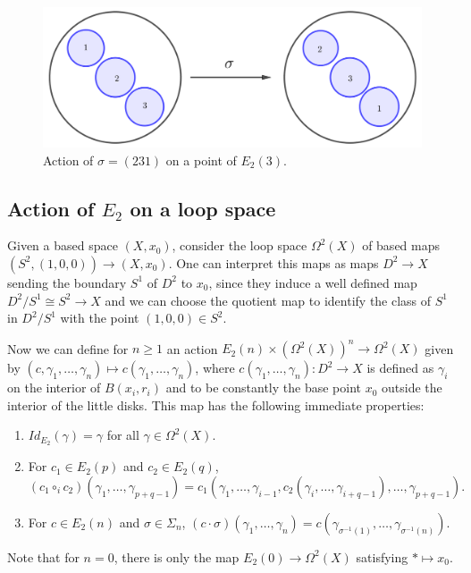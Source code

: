 \documentclass[TFM.tex]{subfiles}
\begin{document}
\begin{figure}[h!]
\includegraphics[scale=0.35]{Imagenes//accion}
\caption{Action of $\sigma=(231)$ on a point of $E_2(3)$.}
\end{figure}



\subsection{Action of $E_2$ on a loop space}
Given a based space $(X,x_0)$, consider the loop space $\Omega^2(X)$ of based maps $(S^2, (1,0,0))\to (X, x_0)$. One can interpret this maps as maps $D^2\to X$ sending the boundary $S^1$ of $D^2$ to $x_0$, since they induce a well defined map $D^2/S^1\cong S^2\to X$ and we can choose the quotient map to identify the class of $S^1$ in $D^2/S^1$ with the point $(1,0,0)\in S^2$. 

Now we can define for $n\geq 1$ an action $E_2(n)\times (\Omega^2(X))^n\to \Omega^2(X)$ given by $(c,\gamma_1,\dots, \gamma_n)\mapsto c(\gamma_1,\dots, \gamma_n)$, where 
$c(\gamma_1,\dots, \gamma_n):D^2\to X$ is defined as $\gamma_i$ on the interior of $B(x_i,r_i)$ and to be constantly the base point $x_0$ outside the interior of the little disks. This map has the following immediate properties:
\begin{enumerate}
\item $Id_{E_2}(\gamma)=\gamma$ for all $\gamma\in \Omega^2(X)$.
\item For $c_1\in E_2(p)$ and $c_2\in E_2(q)$, 
$$(c_1\circ_i c_2)(\gamma_1,\dots, \gamma_{p+q-1})=c_1(\gamma_1,\dots, \gamma_{i-1}, c_2(\gamma_i,\dots, \gamma_{i+q-1}),\dots, \gamma_{p+q-1}).$$ 
\item For $c\in E_2(n)$ and $\sigma\in\Sigma_n$, $(c\cdot \sigma)(\gamma_1,\dots,\gamma_n)=c(\gamma_{\sigma^{-1}(1)},\dots, \gamma_{\sigma^{-1}(n)})$. 
\end{enumerate}
Note that for $n=0$, there is only the map $E_2(0)\to\Omega^2(X)$ satisfying $*\mapsto x_0$. 
\end{document}
